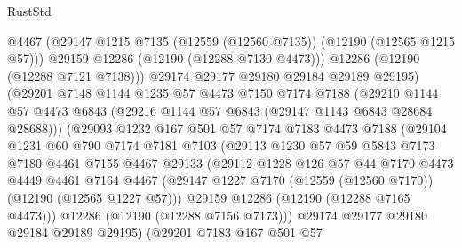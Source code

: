 \begin{lexlean}{RustStd}
\begin{coremodule}
                      @4467
                      (@29147 @1215 @7135 (@12559 (@12560 @7135)) (@12190 (@12565 @1215 @57)))
                      @29159
                      @12286
                      (@12190 (@12288 @7130 @4473)))
                    @12286
                    (@12190 (@12288 @7121 @7138)))
                  @29174
                  @29177
                  @29180
                  @29184
                  @29189
                  @29195)
                (@29201
                  @7148
                  @1144
                  @1235
                  @57
                  @4473
                  @7150
                  @7174
                  @7188
                  (@29210
                    @1144
                    @57
                    @4473
                    @6843
                    (@29216 @1144 @57 @6843 (@29147 @1143 @6843 @28684 @28688)))
                  (@29093
                    @1232
                    @167
                    @501
                    @57
                    @7174
                    @7183
                    @4473
                    @7188
                    (@29104
                      @1231
                      @60
                      @790
                      @7174
                      @7181
                      @7103
                      (@29113
                        @1230
                        @57
                        @59
                        @5843
                        @7173
                        @7180
                        @4461
                        @7155
                        @4467
                        @29133
                        (@29112
                          @1228
                          @126
                          @57
                          @44
                          @7170
                          @4473
                          @4449
                          @4461
                          @7164
                          @4467
                          (@29147 @1227 @7170 (@12559 (@12560 @7170)) (@12190 (@12565 @1227 @57)))
                          @29159
                          @12286
                          (@12190 (@12288 @7165 @4473)))
                        @12286
                        (@12190 (@12288 @7156 @7173)))
                      @29174
                      @29177
                      @29180
                      @29184
                      @29189
                      @29195)
                    (@29201
                      @7183
                      @167
                      @501
                      @57

\end{coremodule}
\end{lexlean}
